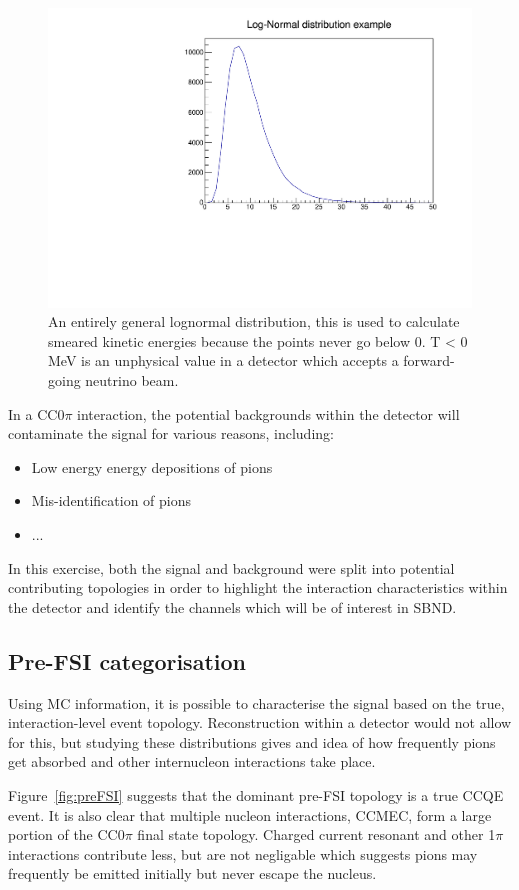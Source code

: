     \begin{figure}[h!]
        \centering
        \includegraphics[width=.7\textwidth, trim=0 0 0 1cm, clip]{images/log_norm.pdf}
        \caption{An entirely general lognormal distribution, this is used to calculate smeared kinetic energies because the points never go below 0. T < 0 MeV is an unphysical value in a detector which accepts a forward-going neutrino beam.}
        \label{fig:logNorm}
    \end{figure}

In a CC0\(\pi\) interaction, the potential backgrounds within the detector will contaminate the signal for various reasons, including:

\begin{itemize}
    \item Low energy energy depositions of pions
    \item Mis-identification of pions
    \item ...
\end{itemize}

In this exercise, both the signal and background were split into potential contributing topologies in order to highlight the interaction characteristics within the detector and identify the channels which will be of interest in SBND. 

\subsection{Pre-FSI categorisation}

Using MC information, it is possible to characterise the signal based on the true, interaction-level event topology. Reconstruction within a detector would not allow for this, but studying these distributions gives and idea of how frequently pions get absorbed and other internucleon interactions take place.  

Figure~\ref{fig:preFSI} suggests that the dominant pre-FSI topology is a true CCQE event. It is also clear that multiple nucleon interactions, CCMEC, form a large portion of the CC0\(\pi\) final state topology. Charged current resonant and other 1\(\pi\) interactions contribute less, but are not negligable which suggests pions may frequently be emitted initially but never escape the nucleus.  

